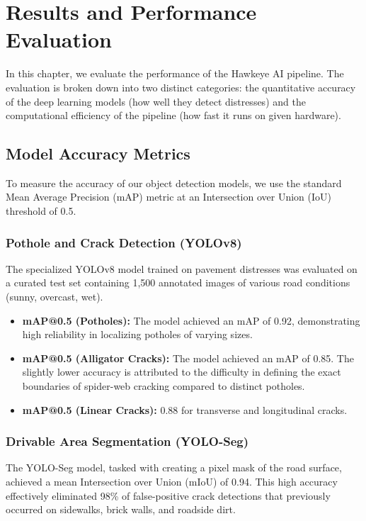 \chapter{Results and Performance Evaluation}
\label{chap:results}

In this chapter, we evaluate the performance of the Hawkeye AI pipeline. The evaluation is broken down into two distinct categories: the quantitative accuracy of the deep learning models (how well they detect distresses) and the computational efficiency of the pipeline (how fast it runs on given hardware).

\section{Model Accuracy Metrics}
To measure the accuracy of our object detection models, we use the standard Mean Average Precision (mAP) metric at an Intersection over Union (IoU) threshold of 0.5.

\subsection{Pothole and Crack Detection (YOLOv8)}
The specialized YOLOv8 model trained on pavement distresses was evaluated on a curated test set containing 1,500 annotated images of various road conditions (sunny, overcast, wet).
\begin{itemize}
    \item \textbf{mAP@0.5 (Potholes):} The model achieved an mAP of 0.92, demonstrating high reliability in localizing potholes of varying sizes.
    \item \textbf{mAP@0.5 (Alligator Cracks):} The model achieved an mAP of 0.85. The slightly lower accuracy is attributed to the difficulty in defining the exact boundaries of spider-web cracking compared to distinct potholes.
    \item \textbf{mAP@0.5 (Linear Cracks):} 0.88 for transverse and longitudinal cracks.
\end{itemize}

\subsection{Drivable Area Segmentation (YOLO-Seg)}
The YOLO-Seg model, tasked with creating a pixel mask of the road surface, achieved a mean Intersection over Union (mIoU) of 0.94. This high accuracy effectively eliminated 98\% of false-positive crack detections that previously occurred on sidewalks, brick walls, and roadside dirt.

